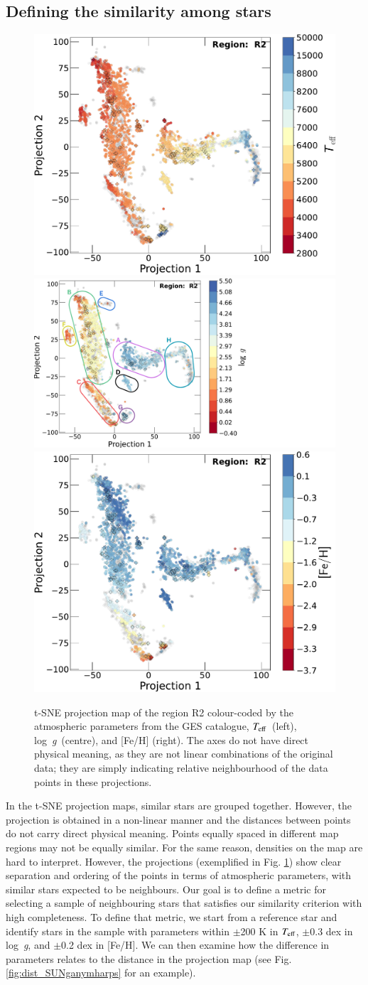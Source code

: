 \documentclass{aa}
\def\teff{$\textit{T}_{\rm{eff}}$}
\def\logg{\mbox{log~{\it g}}}
\begin{document}
 
\subsection{Defining the similarity among stars}
\label{subsec:method_similarstars}

\begin{figure}[t]
  \centering
  \includegraphics[width=0.33\linewidth]{Plots/projection_map_regions_teff.pdf}
  \includegraphics[width=0.33\linewidth]{Plots/projection_map_regions_logg.pdf}
  \includegraphics[width=0.33\linewidth]{Plots/projection_map_regions_feh.pdf}
  \caption{t-SNE projection map of the region R2 colour-coded by the atmospheric parameters from the GES catalogue, \teff\ (left), \logg\ (centre), and [Fe/H] (right). The axes do not have direct physical meaning, as they are not linear combinations of the original data; they are simply indicating relative neighbourhood of the data points in these projections.}
  \label{fig:projection_map_regions}
\end{figure}


In the t-SNE projection maps, similar stars are grouped together. However, the projection is obtained in a non-linear manner and the distances between points do not carry direct physical meaning. Points equally spaced in different map regions may not be equally similar. For the same reason, densities on the map are hard to interpret. However, the projections (exemplified in Fig. \ref{fig:projection_map_regions}) show clear separation and ordering of the points in terms of atmospheric parameters, with similar stars expected to be neighbours. Our goal is to define a metric for selecting a sample of neighbouring stars that satisfies our similarity criterion with high completeness. To define that metric, we start from a reference star and identify stars in the sample with parameters within $\pm$200 K in \teff, $\pm$0.3 dex in \logg, and $\pm$0.2 dex in [Fe/H]. We can then examine how the difference in parameters relates to the distance in the projection map (see Fig. \ref{fig:dist_SUNganymharps} for an example).
\end{document}
